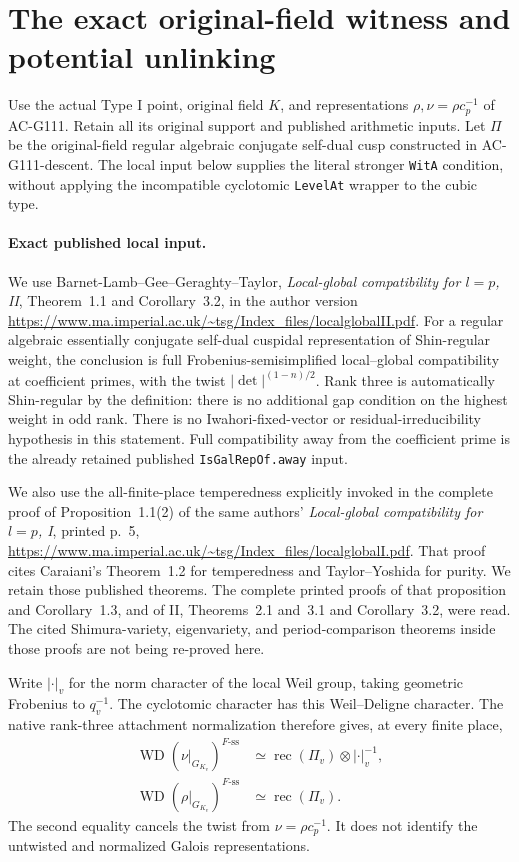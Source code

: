 \section{The exact original-field witness and potential unlinking}
\label{sec:cubic-original-field-witness}

Use the actual Type I point, original field \(K\), and
representations \(\rho,\nu=\rho c_p^{-1}\) of AC-G111.
Retain all its original support and published arithmetic
inputs. Let \(\Pi\) be the original-field regular algebraic
conjugate self-dual cusp constructed in AC-G111-descent.
The local input below supplies the literal stronger
\texttt{WitA} condition, without applying the incompatible
cyclotomic \texttt{LevelAt} wrapper to the cubic type.

\paragraph{Exact published local input.}
We use Barnet-Lamb--Gee--Geraghty--Taylor,
\emph{Local-global compatibility for \(l=p\), II},
Theorem~1.1 and Corollary~3.2, in the author version
\url{https://www.ma.imperial.ac.uk/~tsg/Index_files/localglobalII.pdf}.
For a regular algebraic essentially conjugate self-dual
cuspidal representation of Shin-regular weight, the
conclusion is full Frobenius-semisimplified local--global
compatibility at coefficient primes, with the twist
\(|\det|^{(1-n)/2}\). Rank three is automatically
Shin-regular by the definition: there is no additional
gap condition on the highest weight in odd rank.
There is no Iwahori-fixed-vector or residual-irreducibility
hypothesis in this statement. Full compatibility away
from the coefficient prime is the already retained
published \texttt{IsGalRepOf.away} input.

We also use the all-finite-place temperedness explicitly
invoked in the complete proof of Proposition~1.1(2) of
the same authors' \emph{Local-global compatibility for
\(l=p\), I}, printed p.~5,
\url{https://www.ma.imperial.ac.uk/~tsg/Index_files/localglobalI.pdf}.
That proof cites Caraiani's Theorem~1.2 for temperedness
and Taylor--Yoshida for purity. We retain those published
theorems. The complete printed proofs of that proposition
and Corollary~1.3, and of II, Theorems~2.1 and~3.1 and
Corollary~3.2, were read. The cited Shimura-variety,
eigenvariety, and period-comparison theorems inside those
proofs are not being re-proved here.

Write \(|\cdot|_v\) for the norm character of the local
Weil group, taking geometric Frobenius to \(q_v^{-1}\).
The cyclotomic character has this Weil--Deligne character.
The native rank-three attachment normalization therefore
gives, at every finite place,
\[
 \begin{split}
 \operatorname{WD}(\nu|_{G_{K_v}})^{F\text{-ss}}
   &\simeq \operatorname{rec}(\Pi_v)\otimes|\cdot|_v^{-1},\\
 \operatorname{WD}(\rho|_{G_{K_v}})^{F\text{-ss}}
   &\simeq \operatorname{rec}(\Pi_v).
 \end{split}
 \tag{G111W.1}
\]
The second equality cancels the twist from
\(\nu=\rho c_p^{-1}\). It does not identify the
untwisted and normalized Galois representations.

